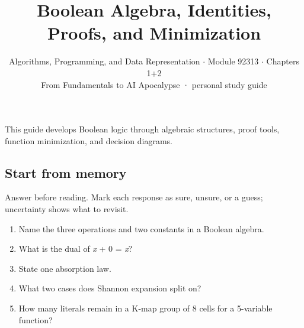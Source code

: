 \documentclass[11pt]{article}
\title{\sffamily\bfseries\color{FAUblue}Boolean Algebra, Identities, Proofs, and Minimization}
\author{Algorithms, Programming, and Data Representation \ensuremath{\cdot} Module 92313 \ensuremath{\cdot} Chapters 1+2\\[2pt]\small From Fundamentals to AI Apocalypse · personal study guide}
\date{}
\begin{document}
\maketitle
\begingroup\footnotesize\setlength{\parskip}{0pt}\tableofcontents\endgroup
\clearpage

{\large This guide develops Boolean logic through algebraic structures, proof tools, function minimization, and decision diagrams.}


\begin{keepsection}
\section{Start from memory}

Answer before reading. Mark each response as sure, unsure, or a guess; uncertainty shows what to revisit.

\begin{enumerate}
\item Name the three operations and two constants in a Boolean algebra.
\item What is the dual of \textit{x} + 0 = \textit{x}?
\item State one absorption law.
\item What two cases does Shannon expansion split on?
\item How many literals remain in a K-map group of 8 cells for a 5-variable function?
\end{enumerate}

\end{keepsection}
\end{document}
